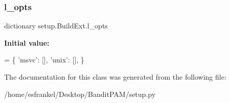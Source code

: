 \subsubsection{\texorpdfstring{l\+\_\+opts}{l\_opts}}
{\footnotesize\ttfamily dictionary setup.\+Build\+Ext.\+l\+\_\+opts\hspace{0.3cm}{\ttfamily [static]}}

{\bfseries Initial value\+:}
\begin{DoxyCode}
=  \{
        \textcolor{stringliteral}{'msvc'}: [],
        \textcolor{stringliteral}{'unix'}: [],
    \}
\end{DoxyCode}


The documentation for this class was generated from the following file\+:\begin{DoxyCompactItemize}
\item 
/home/esfrankel/\+Desktop/\+Bandit\+P\+A\+M/setup.\+py\end{DoxyCompactItemize}
